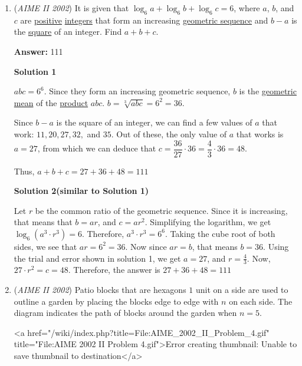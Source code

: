 \begin{enumerate}
 


	\item (\textit{AIME II 2002}) It is given that $\log_{6}a + \log_{6}b + \log_{6}c = 6$, where $a$, $b$, and $c$ are \href{https://artofproblemsolving.com/wiki/index.php?title=Positive}{positive} \href{https://artofproblemsolving.com/wiki/index.php?title=Integer}{integers} that form an increasing \href{https://artofproblemsolving.com/wiki/index.php?title=Geometric\_sequence}{geometric sequence} and $b - a$ is the \href{https://artofproblemsolving.com/wiki/index.php?title=Perfect\_square}{square} of an integer. Find $a + b + c$.


 
 \textbf{Answer: }111



\textbf{Solution 1}

$abc=6^6$. Since they form an increasing geometric sequence, $b$ is the \href{https://artofproblemsolving.com/wiki/index.php?title=Geometric\_mean}{geometric mean} of the \href{https://artofproblemsolving.com/wiki/index.php?title=Product}{product} $abc$. $b=\sqrt[3]{abc}=6^2=36$.

 Since $b-a$ is the square of an integer, we can find a few values of $a$ that work: $11, 20, 27, 32,$ and $35$. Out of these, the only value of $a$ that works is $a=27$, from which we can deduce that $c=\dfrac{36}{27}\cdot 36=\dfrac{4}{3}\cdot 36=48$.

 Thus, $a+b+c=27+36+48=\boxed{111}$




\textbf{Solution 2(similar to Solution 1)}

Let $r$ be the common ratio of the geometric sequence. Since it is increasing, that means that $b = ar$, and $c = ar^2$. Simplifying the logarithm, we get $\log_6(a^3 \cdot r^3) = 6$. Therefore, $a^3 \cdot r^3 = 6^6$. Taking the cube root of both sides, we see that $ar = 6^2 = 36$. Now since $ar = b$, that means $b = 36$. Using the trial and error shown in solution 1, we get $a = 27$, and $r = \frac{4}{3}$. Now, $27 \cdot r^2= c = 48$. Therefore, the answer is $27+36+48 = \boxed{111}$



	\item (\textit{AIME II 2002}) Patio blocks that are hexagons $1$ unit on a side are used to outline a garden by placing the blocks edge to edge with $n$ on each side. The diagram indicates the path of blocks around the garden when $n=5$.


 <a href="/wiki/index.php?title=File:AIME\_2002\_II\_Problem\_4.gif" title="File:AIME 2002 II Problem 4.gif">Error creating thumbnail: Unable to save thumbnail to destination</a>



\end{enumerate}
